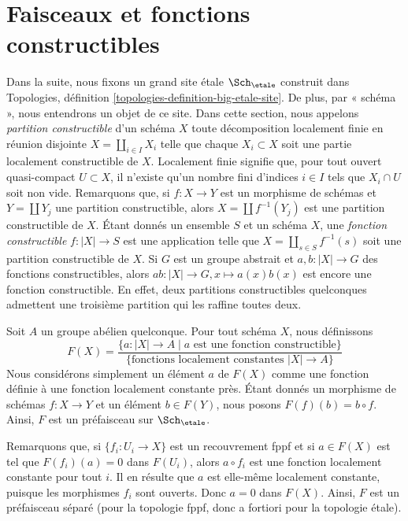 \section{Faisceaux et fonctions constructibles}
\label{section-constructible-functions}

\noindent
Dans la suite, nous fixons un grand site \'etale $\Sch_\etale$ construit dans
Topologies, définition \ref{topologies-definition-big-etale-site}.
De plus, par « schéma », nous entendrons un objet de ce site.
Dans cette section, nous appelons {\it partition constructible}
d'un schéma $X$ toute décomposition localement finie en réunion disjointe
$X = \coprod_{i \in I} X_i$ telle que chaque $X_i \subset X$ soit une
partie localement constructible de $X$. Localement finie signifie que,
pour tout ouvert quasi-compact $U \subset X$, il n'existe qu'un nombre fini
d'indices $i \in I$ tels que $X_i \cap U$ soit non vide.
Remarquons que, si $f : X \to Y$ est un morphisme de schémas et
$Y = \coprod Y_j$ une partition constructible, alors
$X = \coprod f^{-1}(Y_j)$ est une partition constructible de $X$.
Étant donnés un ensemble $S$ et un schéma $X$, une {\it fonction constructible}
$f : |X| \to S$ est une application telle que $X = \coprod_{s \in S} f^{-1}(s)$
soit une partition constructible de $X$.
Si $G$ est un groupe abstrait et $a, b : |X| \to G$ des fonctions
constructibles, alors $ab : |X| \to G, x \mapsto a(x)b(x)$ est encore une fonction
constructible. En effet, deux partitions constructibles quelconques
admettent une troisième partition qui les raffine toutes deux.

\medskip\noindent
Soit $A$ un groupe abélien quelconque. Pour tout schéma $X$, nous définissons
$$
F(X) =
\frac{\{a : |X| \to A \mid a \text{ est une fonction constructible}\}}{\{\text{fonctions localement constantes }|X| \to A\}}
$$
Nous considérons simplement un élément $a$ de $F(X)$ comme une fonction définie
à une fonction localement constante près. Étant donnés un morphisme de schémas
$f : X \to Y$ et un élément $b \in F(Y)$, nous posons
$F(f)(b) = b \circ f$. Ainsi, $F$ est un préfaisceau sur $\Sch_\etale$.

\medskip\noindent
Remarquons que, si $\{f_i : U_i \to X\}$ est un recouvrement fppf et si $a \in F(X)$
est tel que $F(f_i)(a) = 0$ dans $F(U_i)$, alors $a \circ f_i$ est une fonction
localement constante pour tout $i$. Il en résulte que $a$ est elle-même localement
constante, puisque les morphismes $f_i$ sont ouverts. Donc $a = 0$ dans $F(X)$.
Ainsi, $F$ est un préfaisceau séparé (pour la topologie fppf,
donc a fortiori pour la topologie \'etale).

